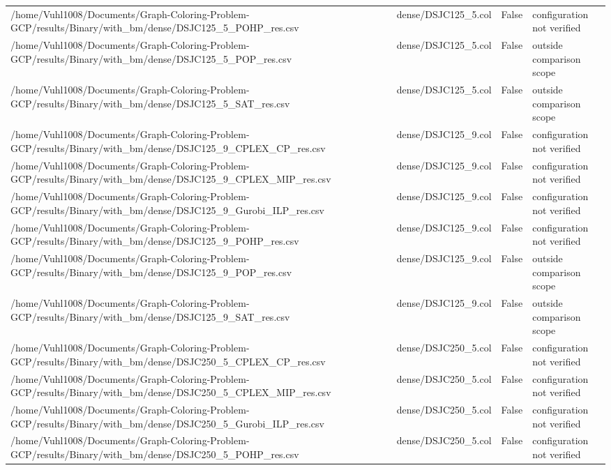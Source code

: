 \begin{table}[htbp]
\begin{tabular}{llll}
/home/Vuhl1008/Documents/Graph-Coloring-Problem-GCP/results/Binary/with\_bm/dense/DSJC125\_5\_POHP\_res.csv & dense/DSJC125\_5.col & False & configuration not verified \\
/home/Vuhl1008/Documents/Graph-Coloring-Problem-GCP/results/Binary/with\_bm/dense/DSJC125\_5\_POP\_res.csv & dense/DSJC125\_5.col & False & outside comparison scope \\
/home/Vuhl1008/Documents/Graph-Coloring-Problem-GCP/results/Binary/with\_bm/dense/DSJC125\_5\_SAT\_res.csv & dense/DSJC125\_5.col & False & outside comparison scope \\
/home/Vuhl1008/Documents/Graph-Coloring-Problem-GCP/results/Binary/with\_bm/dense/DSJC125\_9\_CPLEX\_CP\_res.csv & dense/DSJC125\_9.col & False & configuration not verified \\
/home/Vuhl1008/Documents/Graph-Coloring-Problem-GCP/results/Binary/with\_bm/dense/DSJC125\_9\_CPLEX\_MIP\_res.csv & dense/DSJC125\_9.col & False & configuration not verified \\
/home/Vuhl1008/Documents/Graph-Coloring-Problem-GCP/results/Binary/with\_bm/dense/DSJC125\_9\_Gurobi\_ILP\_res.csv & dense/DSJC125\_9.col & False & configuration not verified \\
/home/Vuhl1008/Documents/Graph-Coloring-Problem-GCP/results/Binary/with\_bm/dense/DSJC125\_9\_POHP\_res.csv & dense/DSJC125\_9.col & False & configuration not verified \\
/home/Vuhl1008/Documents/Graph-Coloring-Problem-GCP/results/Binary/with\_bm/dense/DSJC125\_9\_POP\_res.csv & dense/DSJC125\_9.col & False & outside comparison scope \\
/home/Vuhl1008/Documents/Graph-Coloring-Problem-GCP/results/Binary/with\_bm/dense/DSJC125\_9\_SAT\_res.csv & dense/DSJC125\_9.col & False & outside comparison scope \\
/home/Vuhl1008/Documents/Graph-Coloring-Problem-GCP/results/Binary/with\_bm/dense/DSJC250\_5\_CPLEX\_CP\_res.csv & dense/DSJC250\_5.col & False & configuration not verified \\
/home/Vuhl1008/Documents/Graph-Coloring-Problem-GCP/results/Binary/with\_bm/dense/DSJC250\_5\_CPLEX\_MIP\_res.csv & dense/DSJC250\_5.col & False & configuration not verified \\
/home/Vuhl1008/Documents/Graph-Coloring-Problem-GCP/results/Binary/with\_bm/dense/DSJC250\_5\_Gurobi\_ILP\_res.csv & dense/DSJC250\_5.col & False & configuration not verified \\
/home/Vuhl1008/Documents/Graph-Coloring-Problem-GCP/results/Binary/with\_bm/dense/DSJC250\_5\_POHP\_res.csv & dense/DSJC250\_5.col & False & configuration not verified \\

\end{tabular}
\end{table}
